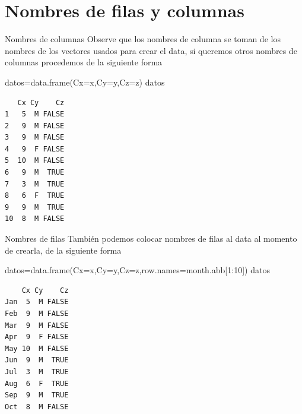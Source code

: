 \documentclass[
  ignorenonframetext,
  aspectratio=169,
  spanish,
]{beamer}
\newenvironment{Shaded}{\begin{snugshade}}{\end{snugshade}}
\newcommand{\AttributeTok}[1]{\textcolor[rgb]{0.40,0.45,0.13}{#1}}
\newcommand{\DecValTok}[1]{\textcolor[rgb]{0.68,0.00,0.00}{#1}}
\newcommand{\FunctionTok}[1]{\textcolor[rgb]{0.28,0.35,0.67}{#1}}
\newcommand{\NormalTok}[1]{\textcolor[rgb]{0.00,0.23,0.31}{#1}}
\newcommand{\OtherTok}[1]{\textcolor[rgb]{0.00,0.23,0.31}{#1}}
\newcommand{\SpecialCharTok}[1]{\textcolor[rgb]{0.37,0.37,0.37}{#1}}
\begin{document}
\section{Nombres de filas y columnas}\label{nombres-de-filas-y-columnas}

\begin{frame}[fragile]{Nombres de columnas}
\label{nombres-de-columnas}
Observe que los nombres de columna se toman de los nombres de los
vectores usados para crear el data, si queremos otros nombres de
columnas procedemos de la siguiente forma

\begin{Shaded}
\begin{Highlighting}[]
\NormalTok{datos}\OtherTok{=}\FunctionTok{data.frame}\NormalTok{(}\AttributeTok{Cx=}\NormalTok{x,}\AttributeTok{Cy=}\NormalTok{y,}\AttributeTok{Cz=}\NormalTok{z) }
\NormalTok{datos}
\end{Highlighting}
\end{Shaded}

\begin{verbatim}
   Cx Cy    Cz
1   5  M FALSE
2   9  M FALSE
3   9  M FALSE
4   9  F FALSE
5  10  M FALSE
6   9  M  TRUE
7   3  M  TRUE
8   6  F  TRUE
9   9  M  TRUE
10  8  M FALSE
\end{verbatim}
\end{frame}

\begin{frame}[fragile]{Nombres de filas}
\label{nombres-de-filas}
También podemos colocar nombres de filas al data al momento de crearla,
de la siguiente forma

\begin{Shaded}
\begin{Highlighting}[]
\NormalTok{datos}\OtherTok{=}\FunctionTok{data.frame}\NormalTok{(}\AttributeTok{Cx=}\NormalTok{x,}\AttributeTok{Cy=}\NormalTok{y,}\AttributeTok{Cz=}\NormalTok{z,}\AttributeTok{row.names=}\NormalTok{month.abb[}\DecValTok{1}\SpecialCharTok{:}\DecValTok{10}\NormalTok{])}
\NormalTok{datos  }
\end{Highlighting}
\end{Shaded}

\begin{verbatim}
    Cx Cy    Cz
Jan  5  M FALSE
Feb  9  M FALSE
Mar  9  M FALSE
Apr  9  F FALSE
May 10  M FALSE
Jun  9  M  TRUE
Jul  3  M  TRUE
Aug  6  F  TRUE
Sep  9  M  TRUE
Oct  8  M FALSE
\end{verbatim}
\end{frame}
\end{document}

